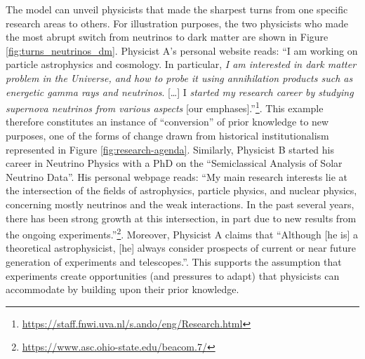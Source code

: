 \documentclass{article}
\begin{document}
The model can unveil physicists that made the sharpest turns from one specific research areas to others. For illustration purposes, the two physicists who made the most abrupt switch from neutrinos to dark matter are shown in Figure \ref{fig:turns_neutrinos_dm}. Physicist A's personal website reads: ``I am working on particle astrophysics and cosmology. In particular, \textit{I am interested in dark matter problem in the Universe, and how to probe it using annihilation products such as energetic gamma rays and neutrinos}. [\dots]  I \textit{started my research career by studying supernova neutrinos from various aspects} [our emphases].''\footnote{\url{https://staff.fnwi.uva.nl/s.ando/eng/Research.html}}. This example therefore constitutes an instance of ``conversion'' of prior knowledge to new purposes, one of the forms of change drawn from historical institutionalism represented in Figure \ref{fig:research-agenda}. Similarly, Physicist B started his career in Neutrino Physics with a PhD on the ``Semiclassical Analysis of Solar Neutrino Data''.  His personal webpage reads: ``My main research interests lie at the intersection of the fields of astrophysics, particle physics, and nuclear physics, concerning mostly neutrinos and the weak interactions. In the past several years, there has been strong growth at this intersection, in part due to new results from the ongoing experiments.''\footnote{\url{https://www.asc.ohio-state.edu/beacom.7/}}. Moreover, Physicist A claims that ``Although [he is] a theoretical astrophysicist, [he] always consider prospects of current or near future generation of experiments and telescopes.''. This supports the assumption that experiments create opportunities (and pressures to adapt) that physicists can accommodate by building upon their prior knowledge. 
\end{document}
